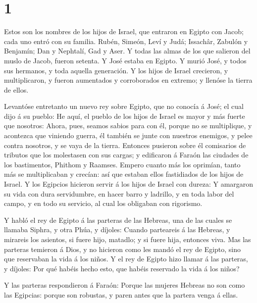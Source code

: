 \hypertarget{section}{%
\section{1}\label{section}}

 Estos son los nombres de los hijos de Israel, que entraron
en Egipto con Jacob; cada uno entró con su familia.  Rubén,
Simeón, Leví y Judá;  Issachâr, Zabulón y Benjamín;
 Dan y Nephtalí, Gad y Aser.  Y todas las almas
de los que salieron del muslo de Jacob, fueron setenta. Y José estaba en
Egipto.  Y murió José, y todos sus hermanos, y toda aquella
generación.  Y los hijos de Israel crecieron, y
multiplicaron, y fueron aumentados y corroborados en extremo; y llenóse
la tierra de ellos.

 Levantóse entretanto un nuevo rey sobre Egipto, que no
conocía á José; el cual dijo á su pueblo:  He aquí, el
pueblo de los hijos de Israel es mayor y más fuerte que nosotros:
 Ahora, pues, seamos sabios para con él, porque no se
multiplique, y acontezca que viniendo guerra, él también se junte con
nuestros enemigos, y pelee contra nosotros, y se vaya de la tierra.
 Entonces pusieron sobre él comisarios de tributos que los
molestasen con sus cargas; y edificaron á Faraón las ciudades de los
bastimentos, Phithom y Raamses.  Empero cuanto más los
oprimían, tanto más se multiplicaban y crecían: así que estaban ellos
fastidiados de los hijos de Israel.  Y los Egipcios
hicieron servir á los hijos de Israel con dureza:  Y
amargaron su vida con dura servidumbre, en hacer barro y ladrillo, y en
toda labor del campo, y en todo su servicio, al cual los obligaban con
rigorismo.

 Y habló el rey de Egipto á las parteras de las Hebreas,
una de las cuales se llamaba Siphra, y otra Phúa, y díjoles:
 Cuando parteareis á las Hebreas, y mirareis los asientos,
si fuere hijo, matadlo; y si fuere hija, entonces viva. 
Mas las parteras temieron á Dios, y no hicieron como les mandó el rey de
Egipto, sino que reservaban la vida á los niños.  Y el rey
de Egipto hizo llamar á las parteras, y díjoles: Por qué habéis hecho
esto, que habéis reservado la vida á los niños?

 Y las parteras respondieron á Faraón: Porque las mujeres
Hebreas no son como las Egipcias: porque son robustas, y paren antes que
la partera venga á ellas.

